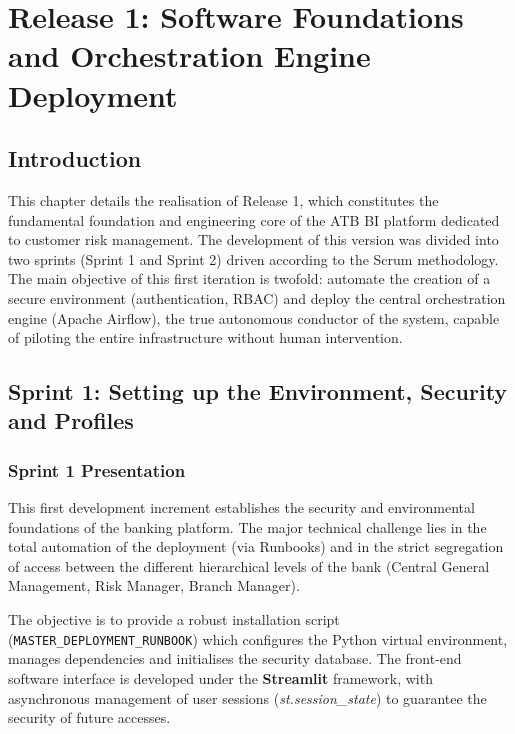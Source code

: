 
\chapter{Release 1: Software Foundations and Orchestration Engine Deployment}

\section{Introduction}
This chapter details the realisation of Release 1, which constitutes the fundamental foundation and engineering core of the ATB BI platform dedicated to customer risk management. The development of this version was divided into two sprints (Sprint 1 and Sprint 2) driven according to the Scrum methodology. The main objective of this first iteration is twofold: automate the creation of a secure environment (authentication, RBAC) and deploy the central orchestration engine (Apache Airflow), the true autonomous conductor of the system, capable of piloting the entire infrastructure without human intervention.

\section{Sprint 1: Setting up the Environment, Security and Profiles}

\subsection{Sprint 1 Presentation}
This first development increment establishes the security and environmental foundations of the banking platform. The major technical challenge lies in the total automation of the deployment (via Runbooks) and in the strict segregation of access between the different hierarchical levels of the bank (Central General Management, Risk Manager, Branch Manager).

The objective is to provide a robust installation script (\texttt{MASTER\_DEPLOYMENT\_RUNBOOK}) which configures the Python virtual environment, manages dependencies and initialises the security database. The front-end software interface is developed under the \textbf{Streamlit} framework, with asynchronous management of user sessions (\textit{st.session\_state}) to guarantee the security of future accesses.

